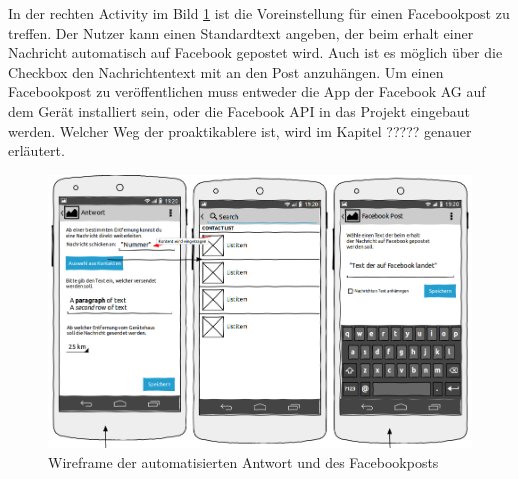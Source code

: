 In der rechten Activity im Bild \ref{Wireframe Antwort} ist die Voreinstellung f\"ur einen Facebookpost zu treffen. Der Nutzer kann einen Standardtext angeben, der beim erhalt einer Nachricht automatisch auf Facebook gepostet wird. Auch ist es m\"oglich \"uber die Checkbox den Nachrichtentext mit an den Post anzuh\"angen. Um einen Facebookpost zu ver\"offentlichen muss entweder die App der Facebook AG auf dem Ger\"at installiert sein, oder die Facebook API in das Projekt eingebaut werden. Welcher Weg der proaktikablere ist, wird im Kapitel ????? genauer erl\"autert.
\begin{figure}[!ht]
\centering
\includegraphics[width=16cm]{Bilder/WireframeAntwort.png}
\caption{Wireframe der automatisierten Antwort und des Facebookposts}
\label{Wireframe Antwort}
\centering
\end{figure}

